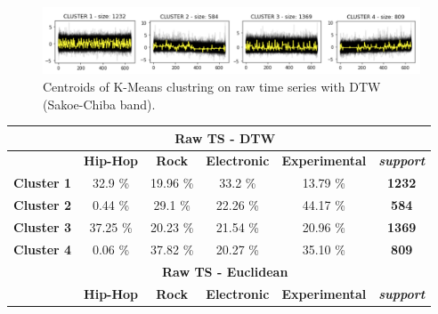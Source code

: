 \begin{figure}[!htb]
  \centering
  \includegraphics[width=1\linewidth]{images/centroids-DTW-RAW.png}
  \caption{Centroids of K-Means clustring on raw time series with DTW (Sakoe-Chiba band).}
\end{figure}


\begin{table}[htb]
\centering
\begin{tabular}{cccccc}
\hline
                   & \multicolumn{4}{c}{\textbf{Raw TS - DTW}}                                                                                                 &                           \\ \hline
\textbf{}          & \textbf{Hip-Hop}                 & \textbf{Rock}                    & \textbf{Electronic}              & \textbf{Experimental}            & \textit{\textbf{support}} \\ \hline
\textbf{Cluster 1} & 32.9 \%                          & 19.96 \%                         & \cellcolor[HTML]{FCFF2F}33.2 \%  & 13.79 \%                         & \textbf{1232}             \\ \hline
\textbf{Cluster 2} & 0.44 \%                          & 29.1 \%                          & 22.26 \%                         & \cellcolor[HTML]{FCFF2F}44.17 \% & \textbf{584}              \\ \hline
\textbf{Cluster 3} & \cellcolor[HTML]{FCFF2F}37.25 \% & 20.23 \%                         & 21.54 \%                         & 20.96 \%                         & \textbf{1369}             \\ \hline
\textbf{Cluster 4} & 0.06 \%                          & \cellcolor[HTML]{FCFF2F}37.82 \% & 20.27 \%                         & 35.10 \%                         & \textbf{809}              \\ \hline
                   & \multicolumn{4}{c}{\textbf{Raw TS - Euclidean}}                                                                                           &                           \\ \hline
\textbf{}          & \textbf{Hip-Hop}                 & \textbf{Rock}                    & \textbf{Electronic}              & \textbf{Experimental}            & \textit{\textbf{support}} \\ \hline

\end{tabular}
\end{table}
